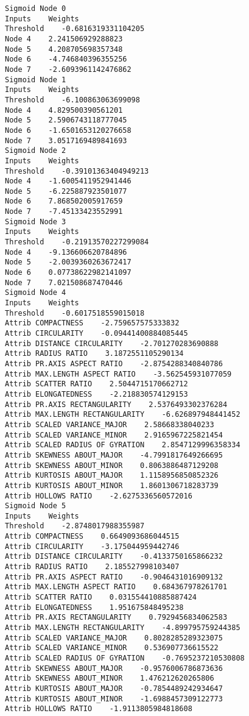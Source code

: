 \documentclass[
	article,			%
	11pt,				%
	oneside,			%
	a4paper,			%
	english,			%
	brazil,				%
	sumario=tradicional
	]{abntex2}
\begin{document}
\begin{lstlisting}
Sigmoid Node 0
Inputs    Weights
Threshold    -0.6816319331104205
Node 4    2.241506929288823
Node 5    4.208705698357348
Node 6    -4.746840396355256
Node 7    -2.6093961142476862
Sigmoid Node 1
Inputs    Weights
Threshold    -6.100863063699098
Node 4    4.829500390561201
Node 5    2.5906743118777045
Node 6    -1.6501653120276658
Node 7    3.0517169489841693
Sigmoid Node 2
Inputs    Weights
Threshold    -0.39101363404949213
Node 4    -1.6005411952941446
Node 5    -6.225887923501077
Node 6    7.868502005917659
Node 7    -7.45133423552991
Sigmoid Node 3
Inputs    Weights
Threshold    -0.21913570227299084
Node 4    -9.136606620784896
Node 5    -2.0039360263672417
Node 6    0.07738622982141097
Node 7    7.021508687470446
Sigmoid Node 4
Inputs    Weights
Threshold    -0.6017518559015018
Attrib COMPACTNESS    -2.759657575333832
Attrib CIRCULARITY    -0.09441400884085445
Attrib DISTANCE CIRCULARITY    -2.701270283690888
Attrib RADIUS RATIO    3.1872551105290134
Attrib PR.AXIS ASPECT RATIO    -2.8754288340840786
Attrib MAX.LENGTH ASPECT RATIO    -3.562545931077059
Attrib SCATTER RATIO    2.5044715170662712
Attrib ELONGATEDNESS    -2.218830574129153
Attrib PR.AXIS RECTANGULARITY    2.5376493302376284
Attrib MAX.LENGTH RECTANGULARITY    -6.626897948441452
Attrib SCALED VARIANCE_MAJOR    2.58668338040233
Attrib SCALED VARIANCE_MINOR    2.9165967225821454
Attrib SCALED RADIUS OF GYRATION    2.8547129996358334
Attrib SKEWNESS ABOUT_MAJOR    -4.7991817649266695
Attrib SKEWNESS ABOUT_MINOR    0.8063886487129208
Attrib KURTOSIS ABOUT_MAJOR    1.1158956850852326
Attrib KURTOSIS ABOUT_MINOR    1.8601306718283739
Attrib HOLLOWS RATIO    -2.6275336560572016
Sigmoid Node 5
Inputs    Weights
Threshold    -2.8748017988355987
Attrib COMPACTNESS    0.6649093686044515
Attrib CIRCULARITY    -3.175044959442746
Attrib DISTANCE CIRCULARITY    -0.4133750165866232
Attrib RADIUS RATIO    2.185527998103407
Attrib PR.AXIS ASPECT RATIO    -0.9046431016909132
Attrib MAX.LENGTH ASPECT RATIO    0.684367978261701
Attrib SCATTER RATIO    0.031554410885887424
Attrib ELONGATEDNESS    1.951675848495238
Attrib PR.AXIS RECTANGULARITY    0.7929456834062583
Attrib MAX.LENGTH RECTANGULARITY    -4.899795759244385
Attrib SCALED VARIANCE_MAJOR    0.8028285289323075
Attrib SCALED VARIANCE_MINOR    0.536907736615522
Attrib SCALED RADIUS OF GYRATION    -0.7695237210530808
Attrib SKEWNESS ABOUT_MAJOR    -0.9576006786873636
Attrib SKEWNESS ABOUT_MINOR    1.476212620265806
Attrib KURTOSIS ABOUT_MAJOR    -0.7854489242934647
Attrib KURTOSIS ABOUT_MINOR    -1.6988457309122773
Attrib HOLLOWS RATIO    -1.9113805984818608

\end{lstlisting}
\end{document}
